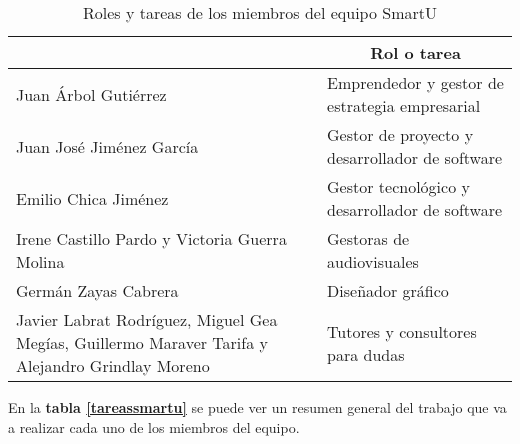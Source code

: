 \begin{table}
    \begin{center}
        \begin{tabular}{|p{5cm}|p{6cm}|}
            \hline
                \rowcolor{Gray}\multicolumn{1}{|c|}{\textbf{Integrante/s}}
                & \multicolumn{1}{|c|}{\textbf{Rol o tarea}} \\
            \hline
                Juan Árbol Gutiérrez & Emprendedor y gestor de estrategia empresarial \\
            \hline
                Juan José Jiménez García & Gestor de proyecto y desarrollador de software \\
            \hline
                Emilio Chica Jiménez & Gestor tecnológico y desarrollador de software \\
            \hline
                Irene Castillo Pardo y Victoria Guerra Molina & Gestoras de audiovisuales \\
            \hline
                Germán Zayas Cabrera & Diseñador gráfico \\
            \hline
                Javier Labrat Rodríguez, Miguel Gea Megías, Guillermo Maraver Tarifa y Alejandro Grindlay Moreno & Tutores y consultores para dudas \\
            \hline
        \end{tabular}

        \caption{Roles y tareas de los miembros del equipo SmartU}
        \label{rolessmartu}
    \end{center}
\end{table}

En la \textbf{tabla \ref{tareassmartu}} se puede ver un resumen general del trabajo que va a realizar cada uno de los miembros del equipo.

